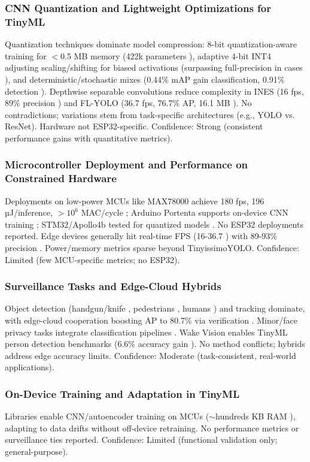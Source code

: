 \documentclass[12pt, a4paper]{article}
\begin{document}
\subsubsection{CNN Quantization and Lightweight Optimizations for TinyML}
Quantization techniques dominate model compression: 8-bit quantization-aware training for $<$0.5 MB memory (422k parameters \cite{moosmann2023}), adaptive 4-bit INT4 adjusting scaling/shifting for biased activations (surpassing full-precision in cases \cite{chin2022}), and deterministic/stochastic mixes (0.44\% mAP gain classification, 0.91\% detection \cite{kim2020}). Depthwise separable convolutions reduce complexity in INES (16 fps, 89\% precision \cite{zhao2020}) and FL-YOLO (36.7 fps, 76.7\% AP, 16.1 MB \cite{xu2021}). No contradictions; variations stem from task-specific architectures (e.g., YOLO vs. ResNet). Hardware not ESP32-specific. Confidence: Strong (consistent performance gains with quantitative metrics).

\subsubsection{Microcontroller Deployment and Performance on Constrained Hardware}
Deployments on low-power MCUs like MAX78000 achieve 180 fps, 196 µJ/inference, $>10^6$ MAC/cycle \cite{moosmann2023}; Arduino Portenta supports on-device CNN training \cite{aatab2023}; STM32/Apollo4b tested for quantized models \cite{moosmann2023}. No ESP32 deployments reported. Edge devices generally hit real-time FPS (16-36.7 \cite{zhao2020, xu2021}) with 89-93\% precision \cite{heredia2019}. Power/memory metrics sparse beyond TinyissimoYOLO. Confidence: Limited (few MCU-specific metrics; no ESP32).

\subsubsection{Surveillance Tasks and Edge-Cloud Hybrids}
Object detection (handgun/knife \cite{liu2023}, pedestrians \cite{xu2021}, humans \cite{nikouei2018sec}) and tracking dominate, with edge-cloud cooperation boosting AP to 80.7\% via verification \cite{xu2021, lyu2022}. Minor/face privacy tasks integrate classification pipelines \cite{yuan2020}. Wake Vision enables TinyML person detection benchmarks (6.6\% accuracy gain \cite{banbury2024}). No method conflicts; hybrids address edge accuracy limits. Confidence: Moderate (task-consistent, real-world applications).

\subsubsection{On-Device Training and Adaptation in TinyML}
Libraries enable CNN/autoencoder training on MCUs ($\sim$hundreds KB RAM \cite{roveri2022, aatab2023}), adapting to data drifts without off-device retraining. No performance metrics or surveillance ties reported. Confidence: Limited (functional validation only; general-purpose).
\end{document}
